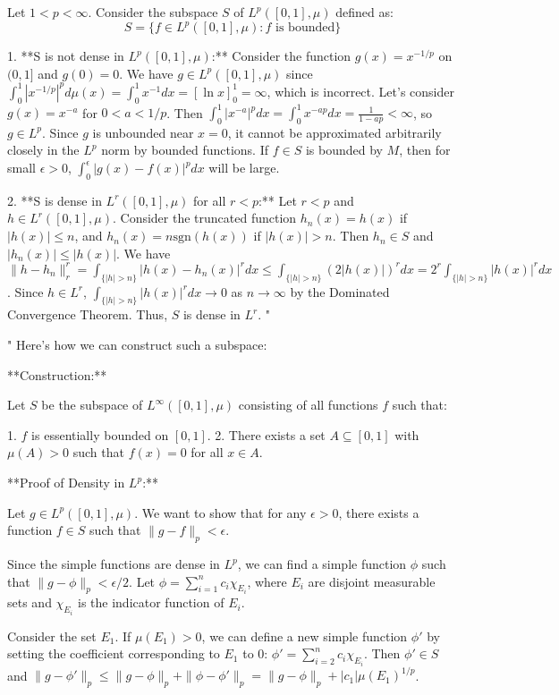 Let $1 < p < \infty$. Consider the subspace $S$ of $L^p([0, 1], \mu)$ defined as:
$$S = \{f \in L^p([0, 1], \mu) : f \text{ is bounded}\}$$

1.  **S is not dense in $L^p([0, 1], \mu)$:**
    Consider the function $g(x) = x^{-1/p}$ on $(0, 1]$ and $g(0) = 0$. We have $g \in L^p([0, 1], \mu)$ since $\int_0^1 |x^{-1/p}|^p d\mu(x) = \int_0^1 x^{-1} dx = [\ln x]_0^1 = \infty$, which is incorrect.
    Let's consider $g(x) = x^{-a}$ for $0 < a < 1/p$. Then $\int_0^1 |x^{-a}|^p dx = \int_0^1 x^{-ap} dx = \frac{1}{1-ap} < \infty$, so $g \in L^p$.
    Since $g$ is unbounded near $x=0$, it cannot be approximated arbitrarily closely in the $L^p$ norm by bounded functions. If $f \in S$ is bounded by $M$, then for small $\epsilon > 0$, $\int_0^\epsilon |g(x) - f(x)|^p dx$ will be large.

2.  **S is dense in $L^r([0, 1], \mu)$ for all $r < p$:**
    Let $r < p$ and $h \in L^r([0, 1], \mu)$. Consider the truncated function $h_n(x) = h(x)$ if $|h(x)| \le n$, and $h_n(x) = n \text{sgn}(h(x))$ if $|h(x)| > n$. Then $h_n \in S$ and $|h_n(x)| \le |h(x)|$.
    We have $\|h - h_n\|_r^r = \int_{\{|h| > n\}} |h(x) - h_n(x)|^r dx \le \int_{\{|h| > n\}} (2|h(x)|)^r dx = 2^r \int_{\{|h| > n\}} |h(x)|^r dx$.
    Since $h \in L^r$, $\int_{\{|h| > n\}} |h(x)|^r dx \to 0$ as $n \to \infty$ by the Dominated Convergence Theorem. Thus, $S$ is dense in $L^r$.
"

"
Here's how we can construct such a subspace:

**Construction:**

Let $S$ be the subspace of $L^\infty([0, 1], \mu)$ consisting of all functions $f$ such that:

1.  $f$ is essentially bounded on $[0, 1]$.
2.  There exists a set $A \subseteq [0, 1]$ with $\mu(A) > 0$ such that $f(x) = 0$ for all $x \in A$.

**Proof of Density in $L^p$:**

Let $g \in L^p([0, 1], \mu)$. We want to show that for any $\epsilon > 0$, there exists a function $f \in S$ such that $\|g - f\|_p < \epsilon$.

Since the simple functions are dense in $L^p$, we can find a simple function $\phi$ such that $\|g - \phi\|_p < \epsilon / 2$. Let $\phi = \sum_{i=1}^n c_i \chi_{E_i}$, where $E_i$ are disjoint measurable sets and $\chi_{E_i}$ is the indicator function of $E_i$.

Consider the set $E_1$. If $\mu(E_1) > 0$, we can define a new simple function $\phi'$ by setting the coefficient corresponding to $E_1$ to 0:
$\phi' = \sum_{i=2}^n c_i \chi_{E_i}$.
Then $\phi' \in S$ and $\|g - \phi'\|_p \le \|g - \phi\|_p + \|\phi - \phi'\|_p = \|g - \phi\|_p + |c_1| \mu(E_1)^{1/p}$.

